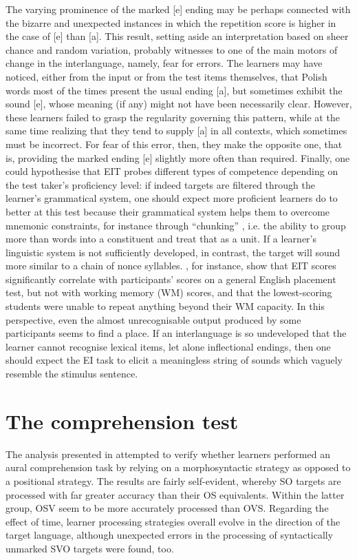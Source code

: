 The varying prominence of the marked [e] ending may be perhaps connected with the bizarre and unexpected instances in which the repetition score is higher in the case of [e] than [a]. This result, setting aside an interpretation based on sheer chance and random variation, probably witnesses to one of the main motors of change in the interlanguage, namely, fear for errors. The learners may have noticed, either from the input or from the test items themselves, that Polish words most of the times present the usual ending [a], but sometimes exhibit the sound [e], whose meaning (if any) might not have been necessarily clear. However, these learners failed to grasp the regularity governing this pattern, while at the same time realizing that they tend to supply [a] in all contexts, which sometimes must be incorrect. For fear of this error, then, they make the opposite one, that is, providing the marked ending [e] slightly more often than required. Finally, one could hypothesise that EIT probes different types of competence depending on the test taker's proficiency level: if indeed targets are filtered through the learner's grammatical system, one should expect more proficient learners do to better at this test because their grammatical system helps them to overcome mnemonic constraints, for instance through ``chunking'' \citep{Miller1956}, i.e. the ability to group more than words into a constituent and treat that as a unit. If a learner's linguistic system is not sufficiently developed, in contrast, the target will sound more similar to a chain of nonce syllables. \citet{OkuraLonsdale2012}, for instance, show that EIT scores significantly correlate with participants' scores on a general English placement test, but not with working memory (WM) scores, and that the lowest-scoring students were unable to repeat anything beyond their WM capacity. In this perspective, even the almost unrecognisable output produced by some participants seems to find a place. If an interlanguage is so undeveloped that the learner cannot recognise lexical items, let alone inflectional endings, then one should expect the EI task to elicit a meaningless string of sounds which vaguely resemble the stimulus sentence.

\section{The comprehension test}\label{sec:08:3}

The analysis presented in  attempted to verify whether learners performed an aural comprehension task by relying on a morphosyntactic strategy as opposed to a positional strategy. The results are fairly self-evident, whereby SO targets are processed with far greater accuracy than their OS equivalents. Within the latter group, OSV seem to be more accurately processed than OVS. Regarding the effect of time, learner processing strategies overall evolve in the direction of the target language, although unexpected errors in the processing of syntactically unmarked SVO targets were found, too.

